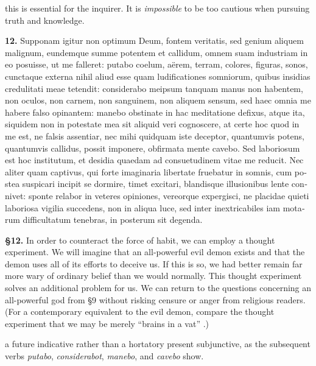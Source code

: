  this is essential for the inquirer. It is \textit{impossible} to be too cautious when pursuing truth and knowledge.

\clearpage

\beginnumbering
\pstart
\begin{latin}
    \textenglish{\textbf{12.}} Supponam igitur non optimum Deum, fontem veritatis, sed genium aliquem malignum, eundemque summe potentem et callidum, omnem suam industriam in eo posuisse, ut me falleret: putabo coelum, aërem, terram, colores, figuras, sonos, cunctaque externa nihil aliud esse quam ludificationes somniorum, quibus insidias credulitati meae tetendit: considerabo meipsum tanquam manus non habentem, non oculos, non carnem, non sanguinem, non aliquem sensum, sed haec omnia me habere falso opinantem: manebo obstinate in hac meditatione defixus, atque ita, siquidem non in potestate mea sit aliquid veri cognoscere, at certe hoc quod in me est, ne falsis assentiar, nec mihi quidquam iste deceptor, quantumvis potens, quantumvis callidus, possit imponere, obfirmata mente cavebo. Sed laboriosum est hoc institutum, et desidia quaedam ad consuetudinem vitae me reducit. Nec aliter quam captivus, qui forte imaginaria libertate fruebatur in somnis, cum postea suspicari incipit se dormire, timet excitari, blandisque illusionibus lente connivet:  sponte relabor in veteres opiniones, vereorque expergisci, ne placidae quieti laboriosa vigilia succedens, non in aliqua luce, sed inter inextricabiles iam motarum difficultatum tenebras, in posterum sit degenda.
\end{latin}
\pend
\endnumbering

\prenotes

\textbf{§12.} In order to counteract the force of habit, we can employ a thought experiment. We will imagine that an all-powerful evil demon exists and that the demon uses all of its efforts to deceive us. If this is so, we had better remain far more wary of ordinary belief than we would normally. This thought experiment solves an additional problem for us. We can return to the questions concerning an all-powerful god from §9 without risking censure or anger from religious readers. (For a contemporary equivalent to the evil demon, compare the thought experiment that we may be merely ``brains in a vat'' \parencite[5]{harman1973}.)

 a future indicative rather than a hortatory present subjunctive, as the subsequent verbs \textit{putabo}, \textit{considerabot}, \textit{manebo}, and \textit{cavebo} show.

